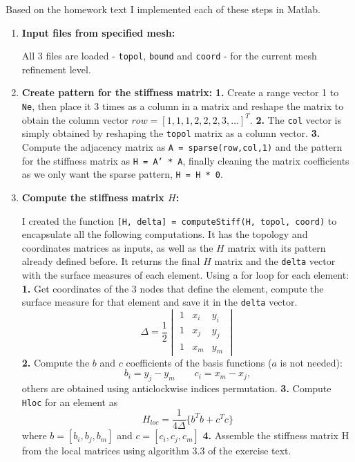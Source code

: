 \documentclass[a4paper, 11pt]{article}
\begin{document}
			
				Based on the homework text I implemented each of these steps in Matlab.
			
			\begin{enumerate}
				\item \textbf{Input files from specified mesh:} 
				
					All 3 files are loaded - \texttt{topol}, \texttt{bound} and \texttt{coord} - for the current mesh refinement level.	
				
				\item \textbf{Create pattern for the stiffness matrix:} 
					\subitem \textbf{1.} Create a range vector 1 to \texttt{Ne}, then place it 3 times as a column in a matrix and reshape the matrix to obtain the column vector $ row = [1,1,1,2,2,2,3,\ldots]^T $. 
					\subitem \textbf{2.} The \texttt{col} vector is simply obtained by reshaping the \texttt{topol} matrix as a column vector. 
					\subitem \textbf{3.} Compute the adjacency matrix as \texttt{A = sparse(row,col,1)} and the pattern for the stiffness matrix as \texttt{H = A' * A}, finally cleaning the matrix coefficients as we only want the sparse pattern, \texttt{H = H * 0}.
				
				\item \textbf{Compute the stiffness matrix $H$:}
				
					I created the function \texttt{[H, delta] = computeStiff(H, topol, coord)} to encapsulate all the following computations.
					It has the topology and coordinates matrices as inputs, as well as the $ H $ matrix with its pattern already defined before.
					It returns the final $ H $ matrix and the \texttt{delta} vector with the surface measures of each element.
					Using a for loop for each element:
					\subitem \textbf{1.} Get coordinates of the 3 nodes that define the element, compute the surface measure for that element and save it in the \texttt{delta} vector.
					$$ \Delta = \frac{1}{2} \begin{vmatrix} 1 & x_i & y_i \\ 1 & x_j & y_j \\ 1 & x_m & y_m \end{vmatrix} $$
					\subitem \textbf{2.} Compute the $ b $ and $ c  $ coefficients of the basis functions ($a$ is not needed): 
					$$  b_i = y_j - y_m  \qquad c_i = x_m - x_j ,$$ others are obtained using anticlockwise indices permutation.
					\subitem \textbf{3.} Compute \texttt{Hloc} for an element as 
					$$ H_{loc} = \frac{1}{4\Delta}\{ b^Tb + c^Tc \} $$ 
					where $ b = [b_i, b_j, b_m]$ and $ c = [c_i, c_j, c_m]$
					\subitem \textbf{4.} Assemble the stiffness matrix H from the local matrices using algorithm 3.3 of the exercise text.
				

\end{enumerate}
\end{document}
